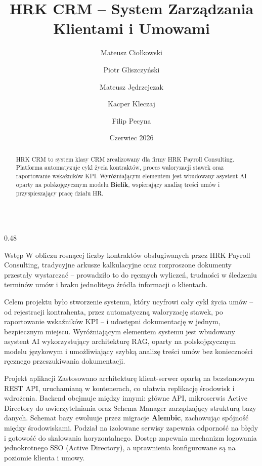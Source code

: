 \documentclass[final]{beamer} %
\title[\hspace{1cm} HRK CRM]{HRK CRM -- System Zarządzania Klientami i Umowami}
\author[\hspace{1cm} M.~Ciołkowski, P.~Gliszczyński, M.~Jędrzejczak, K.~Kleczaj, F.~Pecyna]{%
  Mateusz Ciołkowski \and Piotr Gliszczyński \and Mateusz Jędrzejczak \and Kacper Kleczaj \and Filip Pecyna}
\institute[Instytut Informatyki, Politechnika Łódzka, al. Politechniki 8, 93-590 Łódź \hspace{1cm}]{Instytut Informatyki, Politechnika Łódzka}
\date{Czerwiec 2026}
\begin{document}
\renewcommand{\abstractname}{Streszczenie}
\renewcommand{\figurename}{Rysunek}
\renewcommand{\tablename}{Tabela}
\begin{frame}{}
\maketitle
\begin{abstract}
\centering
HRK CRM to system klasy CRM zrealizowany dla firmy HRK Payroll Consulting. Platforma automatyzuje cykl życia kontraktów, proces waloryzacji stawek oraz raportowanie wskaźników KPI. Wyróżniającym elementem jest wbudowany asystent AI oparty na polskojęzycznym modelu \textbf{Bielik}, wspierający analizę treści umów i przyspieszający pracę działu HR.
\end{abstract}
\begin{columns}[T]
\begin{column}[T]{0.48\textwidth}
\begin{block}{Wstęp}
W obliczu rosnącej liczby kontraktów obsługiwanych przez HRK Payroll Consulting, tradycyjne arkusze kalkulacyjne oraz rozproszone dokumenty przestały wystarczać -- prowadziło to do ręcznych wyliczeń, trudności w śledzeniu terminów umów i braku jednolitego źródła informacji o klientach.

Celem projektu było stworzenie systemu, który ucyfrowi cały cykl życia umów -- od rejestracji kontrahenta, przez automatyczną waloryzację stawek, po raportowanie wskaźników KPI -- i udostępni dokumentację w jednym, bezpiecznym miejscu. Wyróżniającym elementem systemu jest wbudowany asystent AI wykorzystujący architekturę RAG, oparty na polskojęzycznym modelu językowym i umożliwiający szybką analizę treści umów bez konieczności ręcznego przeszukiwania dokumentacji.
\end{block}
\begin{block}{Projekt aplikacji}
Zastosowano architekturę klient-serwer opartą na bezstanowym REST API, uruchamianą w kontenerach, co ułatwia replikację środowisk i wdrożenia. Backend obejmuje między innymi: główne API, mikroserwis Active Directory do uwierzytelniania oraz Schema Manager zarządzający strukturą bazy danych. Schemat bazy ewoluuje przez migracje \textbf{Alembic}, zachowując spójność między środowiskami. Podział na izolowane serwisy zapewnia odporność na błędy i gotowość do skalowania horyzontalnego. Dostęp zapewnia mechanizm logowania jednokrotnego SSO (Active Directory), a uprawnienia konfigurowane są na poziomie klienta i umowy.


\end{block}
\end{column}
\end{columns}
\end{frame}
\end{document}
